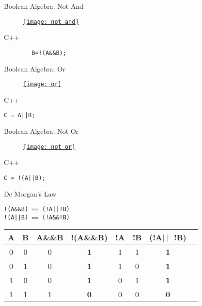 \documentclass[xcolor={dvipsnames}]{beamer}
\begin{document}
\begin{frame}[fragile]{Boolean Algebra: Not And}
\begin{figure}
		\href{http://www.daviddarling.info/encyclopedia/B/Boolean_algebra.html}{\texttt{[image: not\_and]}}
	\end{figure}
	\pause
	\begin{block}{C++}
\Huge
		\begin{verbatim}
		B=!(A&&B);
		\end{verbatim}
	\end{block}

\end{frame}

\begin{frame}[fragile]{Boolean Algebra: Or}
\begin{figure}
		\href{http://www.daviddarling.info/encyclopedia/B/Boolean_algebra.html}{\texttt{[image: or]}}
\end{figure}
\pause
	\begin{block}{C++}
\Huge
\begin{verbatim}
C = A||B;
\end{verbatim}
	\end{block}
\end{frame}

\begin{frame}[fragile]{Boolean Algebra: Not Or}
\begin{figure}
		\href{http://www.daviddarling.info/encyclopedia/B/Boolean_algebra.html}{\texttt{[image: not\_or]}}
	\end{figure}
	\pause
	\begin{block}{C++}
\Huge
\begin{verbatim}
C = !(A||B);
\end{verbatim}
	\end{block}
\end{frame}

\begin{frame}[fragile]{De Morgan's Law}
\Huge
\begin{center}
\begin{verbatim}
!(A&&B) == (!A||!B)
!(A||B) == (!A&&!B)
\end{verbatim}
\end{center}
\begin{block}{}
\Large
\begin{center}
\begin{tabular}{|c|c|c|c|c|c|c|c|}
\hline
A & B & A\&\&B & \textbf{!(A\&\&B)} & !A & !B &\textbf{(!A$\mid \mid$ !B)} \\
\hline
0 & 0 & 0 & \textbf{1} & 1 & 1 &  \textbf{1}\\
\hline
0 & 1 & 0 & \textbf{1} & 1 & 0 & \textbf{1}\\
\hline
1 & 0 & 0 & \textbf{1} & 0 & 1 & \textbf{1} \\
\hline
1 & 1 & 1 & \textbf{0} & 0 & 0  & \textbf{0} \\
\hline
\end{tabular}
\end{center}
\end{block}
\end{frame}
\end{document}
